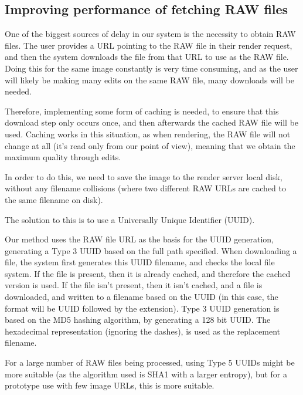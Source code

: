 \documentclass[10pt,a4paper]{article}
\begin{document}
\subsection{Improving performance of fetching RAW files}\label{LocalImageCaching}
One of the biggest sources of delay in our system is the necessity to obtain RAW files. The user
provides a URL pointing to the RAW file in their render request, and then the system downloads the file
from that URL to use as the RAW file. Doing this for the same image constantly is very time consuming, and
as the user will likely be making many edits on the same RAW file, many downloads will be needed.

Therefore, implementing some form of caching is needed, to ensure that this download step only occurs once,
and then afterwards the cached RAW file will be used. Caching works in this situation, as when rendering,
the RAW file will not change at all (it's read only from our point of view), meaning that we obtain the
maximum quality through edits.

In order to do this, we need to save the image to the render server local disk, without any filename collisions
(where two different RAW URLs are cached to the same filename on disk).

The solution to this is to use a Universally Unique Identifier (UUID).

Our method uses the RAW file URL as the basis for the UUID generation, generating a Type 3 UUID based on the full path specified.
When downloading a file, the system first generates this UUID filename, and checks the local file system. If the file is present, then it
is already cached, and therefore the cached version is used. If the file isn't present, then it isn't cached, and a file is downloaded, and 
written to a filename based on the UUID (in this case, the format will be UUID followed by the extension). Type 3 UUID generation is based on
the MD5 hashing algorithm, by generating a 128 bit UUID. The hexadecimal representation (ignoring the dashes), is used as the replacement filename.


For a large number of RAW files being processed, using Type 5 UUIDs might be more suitable (as the algorithm used is SHA1 with a larger entropy), but
for a prototype use with few image URLs, this is more suitable.
\end{document}
